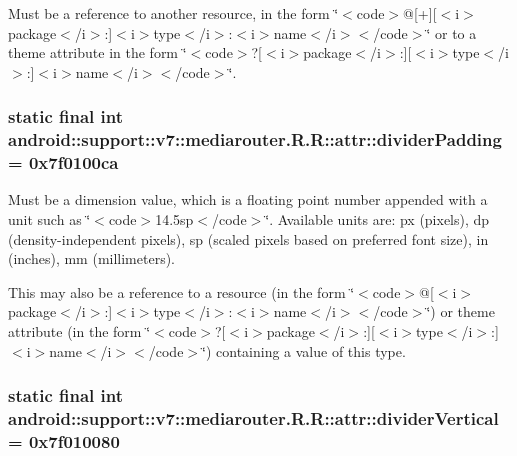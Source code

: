 Must be a reference to another resource, in the form \char`\"{}$<$code$>$@\mbox{[}+\mbox{]}\mbox{[}$<$i$>$package$<$/i$>$:\mbox{]}$<$i$>$type$<$/i$>$:$<$i$>$name$<$/i$>$$<$/code$>$\char`\"{} or to a theme attribute in the form \char`\"{}$<$code$>$?\mbox{[}$<$i$>$package$<$/i$>$:\mbox{]}\mbox{[}$<$i$>$type$<$/i$>$:\mbox{]}$<$i$>$name$<$/i$>$$<$/code$>$\char`\"{}. \hypertarget{classandroid_1_1support_1_1v7_1_1mediarouter_1_1_r_1_1attr_79106137db9b26f5db9721641a902842}{
\subsubsection[{dividerPadding}]{\setlength{\rightskip}{0pt plus 5cm}static final int android::support::v7::mediarouter.R.R::attr::dividerPadding = 0x7f0100ca}}
\label{classandroid_1_1support_1_1v7_1_1mediarouter_1_1_r_1_1attr_79106137db9b26f5db9721641a902842}


Must be a dimension value, which is a floating point number appended with a unit such as \char`\"{}$<$code$>$14.5sp$<$/code$>$\char`\"{}. Available units are: px (pixels), dp (density-independent pixels), sp (scaled pixels based on preferred font size), in (inches), mm (millimeters). 

This may also be a reference to a resource (in the form \char`\"{}$<$code$>$@\mbox{[}$<$i$>$package$<$/i$>$:\mbox{]}$<$i$>$type$<$/i$>$:$<$i$>$name$<$/i$>$$<$/code$>$\char`\"{}) or theme attribute (in the form \char`\"{}$<$code$>$?\mbox{[}$<$i$>$package$<$/i$>$:\mbox{]}\mbox{[}$<$i$>$type$<$/i$>$:\mbox{]}$<$i$>$name$<$/i$>$$<$/code$>$\char`\"{}) containing a value of this type. \hypertarget{classandroid_1_1support_1_1v7_1_1mediarouter_1_1_r_1_1attr_93b59e7b59829bcdb2ba72033bb43f9e}{
\subsubsection[{dividerVertical}]{\setlength{\rightskip}{0pt plus 5cm}static final int android::support::v7::mediarouter.R.R::attr::dividerVertical = 0x7f010080}}
\label{classandroid_1_1support_1_1v7_1_1mediarouter_1_1_r_1_1attr_93b59e7b59829bcdb2ba72033bb43f9e}


